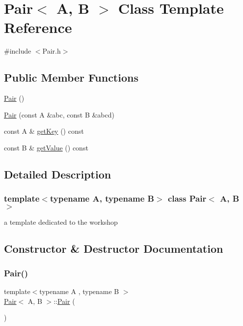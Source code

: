 \hypertarget{class_pair}{}\section{Pair$<$ A, B $>$ Class Template Reference}
\label{class_pair}


{\ttfamily \#include $<$Pair.\+h$>$}

\subsection*{Public Member Functions}
\begin{DoxyCompactItemize}
\item 
\mbox{\hyperlink{class_pair_abd2f69806ab7f320b0d1e0232556d3ab}{Pair}} ()
\item 
\mbox{\hyperlink{class_pair_aa26b7a4d230bcbabaa13b56a8f93c8a9}{Pair}} (const A \&abc, const B \&abcd)
\item 
const A \& \mbox{\hyperlink{class_pair_a8bee912d3270c63944353caf2fa6330e}{get\+Key}} () const
\item 
const B \& \mbox{\hyperlink{class_pair_a6e1448bc216f86227f856a767f02e014}{get\+Value}} () const
\end{DoxyCompactItemize}


\subsection{Detailed Description}
\subsubsection*{template$<$typename A, typename B$>$\newline
class Pair$<$ A, B $>$}

a template dedicated to the workshop 

\subsection{Constructor \& Destructor Documentation}
\mbox{\label{class_pair_abd2f69806ab7f320b0d1e0232556d3ab}} 
\subsubsection{\texorpdfstring{Pair()}{Pair()}\hspace{0.1cm}{\footnotesize\ttfamily [1/2]}}
{\footnotesize\ttfamily template$<$typename A , typename B $>$ \\
\mbox{\hyperlink{class_pair}{Pair}}$<$ A, B $>$\+::\mbox{\hyperlink{class_pair}{Pair}} (\begin{DoxyParamCaption}{ }\end{DoxyParamCaption})}

